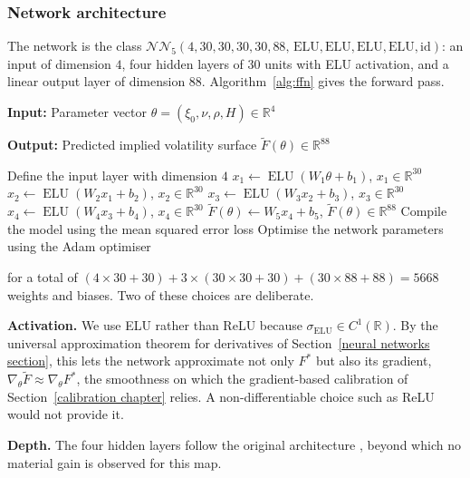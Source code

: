 \documentclass[12pt,a4paper]{article}
\theoremstyle{remark} \newtheorem{remark}[theorem]{Remark}
\begin{document}
\subsubsection{Network architecture}
The network is the class $\mathcal N\mathcal N_5(4,30,30,30,30,88,\, \mathrm{ELU}, \mathrm{ELU}, \mathrm{ELU}, \mathrm{ELU}, \mathrm{id})$: an input of dimension $4$, four hidden layers of $30$ units with ELU activation, and a linear output layer of dimension $88$. Algorithm~\ref{alg:ffn} gives the forward pass.




\begin{algorithm}[H]
\caption{Feed-forward neural network architecture}
\label{alg:ffn}
\begin{algorithmic}[1]

\State \textbf{Input:} Parameter vector
$\theta=(\xi_0,\nu,\rho,H)\in\mathbb{R}^4$

\State \textbf{Output:} Predicted implied volatility surface
$\widetilde{F}(\theta)\in\mathbb{R}^{88}$

\State Define the input layer with dimension $4$
\State $x_1 \gets \operatorname{ELU}\!\left(W_1\theta+b_1\right)$,
\quad $x_1\in\mathbb{R}^{30}$
\State $x_2 \gets \operatorname{ELU}\!\left(W_2x_1+b_2\right)$,
\quad $x_2\in\mathbb{R}^{30}$
\State $x_3 \gets \operatorname{ELU}\!\left(W_3x_2+b_3\right)$,
\quad $x_3\in\mathbb{R}^{30}$
\State $x_4 \gets \operatorname{ELU}\!\left(W_4x_3+b_4\right)$,
\quad $x_4\in\mathbb{R}^{30}$
\State $\widetilde{F}(\theta)\gets W_5x_4+b_5$,
\quad $\widetilde{F}(\theta)\in\mathbb{R}^{88}$
\State Compile the model using the mean squared error loss
\State Optimise the network parameters using the Adam optimiser

\end{algorithmic}
\end{algorithm}
for a total of $(4\times 30+30)+3\times(30\times30+30)+(30\times 88+88)=5668$ weights and biases. Two of these choices are deliberate.

\textbf{Activation.} We use ELU rather than ReLU because $\sigma_{\mathrm{ELU}}\in C^1(\mathbb R)$. By the universal approximation theorem for derivatives of Section~\ref{neural networks section}, this lets the network approximate not only $F^*$ but also its gradient, $\nabla_\theta\widetilde F\approx\nabla_\theta F^*$, the smoothness on which the gradient-based calibration of Section~\ref{calibration chapter} relies. A non-differentiable choice such as ReLU would not provide it.

\textbf{Depth.} The four hidden layers follow the original architecture \cite{1}, beyond which no material gain is observed for this map.
\end{document}
